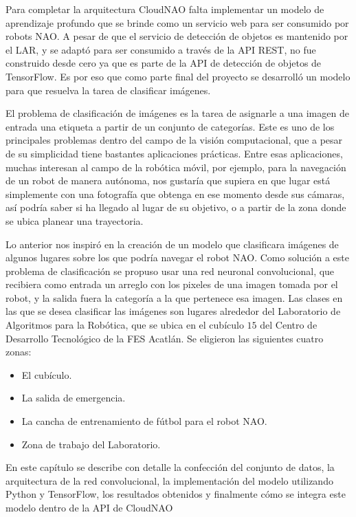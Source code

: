 %
%

Para completar la arquitectura CloudNAO falta implementar un modelo de aprendizaje 
profundo que se brinde como un servicio web para ser consumido por robots NAO.
A pesar de que el servicio de detección de objetos es mantenido por el LAR, y 
se adaptó para ser consumido a través de la API REST, no fue construido
desde cero ya que es parte de la API de detección de objetos de TensorFlow.
Es por eso que como parte final del proyecto se desarrolló un modelo para que 
resuelva la tarea de clasificar imágenes.

El problema de clasificación de imágenes es la tarea de asignarle a una imagen de
entrada una etiqueta a partir de un conjunto de categorías. Este es uno de los principales
problemas dentro del campo de la visión computacional, que a pesar de su simplicidad
tiene bastantes aplicaciones prácticas. Entre esas aplicaciones, muchas interesan al
campo de la robótica móvil, por ejemplo, para la navegación de un robot de manera
autónoma, nos gustaría que supiera en que lugar está simplemente con una fotografía
que obtenga en ese momento desde sus cámaras, así podría saber si ha llegado al 
lugar de su objetivo, o a partir de la zona donde se ubica planear una trayectoria.

Lo anterior nos inspiró en la creación de un modelo que clasificara imágenes
de algunos lugares sobre los que podría navegar el robot NAO. 
Como solución a este problema de clasificación se propuso usar 
una red neuronal convolucional, que recibiera como entrada un arreglo con los
pixeles de una imagen tomada por el robot, y la salida fuera la categoría
a la que pertenece esa imagen. 
Las clases en las que se desea clasificar las imágenes son lugares alrededor
del Laboratorio de Algoritmos para la Robótica, que se ubica en el cubículo $15$ del
Centro de Desarrollo Tecnológico de la FES Acatlán. Se eligieron las siguientes cuatro zonas:

\begin{itemize}
    \item El cubículo.
    \item La salida de emergencia.
    \item La cancha de entrenamiento de fútbol para el robot NAO.
    \item Zona de trabajo del Laboratorio.
\end{itemize}


En este capítulo se describe con detalle la confección del
conjunto de datos, la arquitectura de la red 
convolucional, la implementación
del modelo utilizando Python y TensorFlow, los resultados obtenidos
y finalmente cómo se integra este modelo dentro de la API de CloudNAO 

%
%
